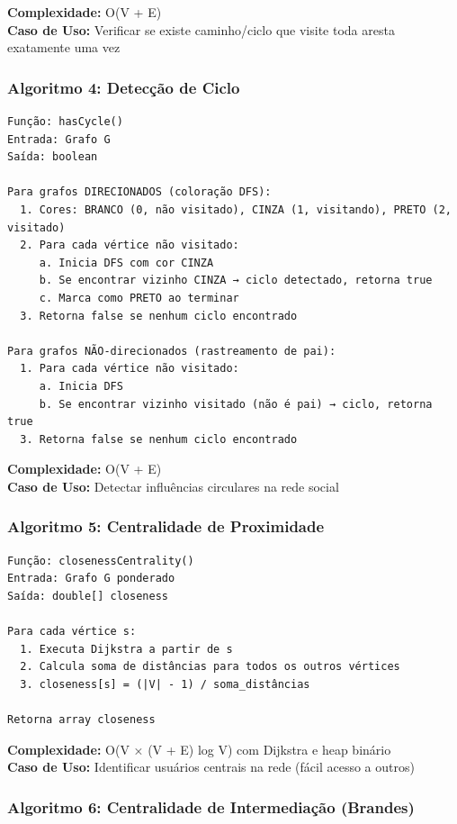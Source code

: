 \documentclass[12pt,a4paper]{article}
\begin{document}
    \textbf{Complexidade:} O(V + E) \\
    \textbf{Caso de Uso:} Verificar se existe caminho/ciclo que visite toda aresta exatamente uma vez

    \subsubsection{Algoritmo 4: Detecção de Ciclo}

    \begin{verbatim}
Função: hasCycle()
Entrada: Grafo G
Saída: boolean

Para grafos DIRECIONADOS (coloração DFS):
  1. Cores: BRANCO (0, não visitado), CINZA (1, visitando), PRETO (2, visitado)
  2. Para cada vértice não visitado:
     a. Inicia DFS com cor CINZA
     b. Se encontrar vizinho CINZA → ciclo detectado, retorna true
     c. Marca como PRETO ao terminar
  3. Retorna false se nenhum ciclo encontrado

Para grafos NÃO-direcionados (rastreamento de pai):
  1. Para cada vértice não visitado:
     a. Inicia DFS
     b. Se encontrar vizinho visitado (não é pai) → ciclo, retorna true
  3. Retorna false se nenhum ciclo encontrado
    \end{verbatim}

    \textbf{Complexidade:} O(V + E) \\
    \textbf{Caso de Uso:} Detectar influências circulares na rede social

    \subsubsection{Algoritmo 5: Centralidade de Proximidade}

    \begin{verbatim}
Função: closenessCentrality()
Entrada: Grafo G ponderado
Saída: double[] closeness

Para cada vértice s:
  1. Executa Dijkstra a partir de s
  2. Calcula soma de distâncias para todos os outros vértices
  3. closeness[s] = (|V| - 1) / soma_distâncias

Retorna array closeness
    \end{verbatim}

    \textbf{Complexidade:} O(V × (V + E) log V) com Dijkstra e heap binário \\
    \textbf{Caso de Uso:} Identificar usuários centrais na rede (fácil acesso a outros)

    \subsubsection{Algoritmo 6: Centralidade de Intermediação (Brandes)}
\end{document}
